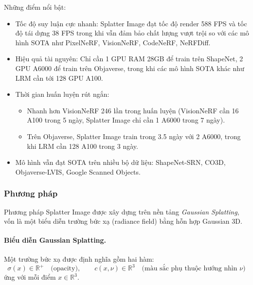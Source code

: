             Những điểm nổi bật:
            \begin{itemize}
            	\item Tốc độ suy luận cực nhanh: Splatter Image đạt tốc độ render 588 FPS và tốc độ tái dựng 38 FPS trong khi vẫn đảm bảo chất lượng vượt trội so với các mô hình SOTA như PixelNeRF, VisionNeRF, CodeNeRF, NeRFDiff.
            	\item Hiệu quả tài nguyên: Chỉ cần 1 GPU RAM 28GB để train trên ShapeNet, 2 GPU A6000 để train trên Objaverse, trong khi các mô hình SOTA khác như LRM cần tới 128 GPU A100.
            	\item Thời gian huấn luyện rút ngắn: 
            		\begin{itemize}
            			\item Nhanh hơn VisionNeRF 246 lần trong huấn luyện (VisionNeRF cần 16 A100 trong 5 ngày, Splatter Image chỉ cần 1 A6000 trong 7 ngày).
            			\item Trên Objaverse, Splatter Image train trong 3.5 ngày với 2 A6000, trong khi LRM cần 128 A100 trong 3 ngày.
            		\end{itemize}
            	\item Mô hình vẫn đạt SOTA trên nhiều bộ dữ liệu: ShapeNet-SRN, CO3D, Objaverse-LVIS, Google Scanned Objects.
            \end{itemize}
            
            \subsubsection{Phương pháp}

                Phương pháp Splatter Image được xây dựng trên nền tảng \textit{Gaussian Splatting}, vốn là một biểu diễn trường bức xạ (radiance field) bằng hỗn hợp Gaussian 3D.  
                
                \paragraph{Biểu diễn Gaussian Splatting.}  
                Một trường bức xạ được định nghĩa gồm hai hàm:
                \[
                \sigma(x) \in \mathbb{R}^+ \quad \text{(opacity)}, \qquad c(x,\nu) \in \mathbb{R}^3 \quad \text{(màu sắc phụ thuộc hướng nhìn $\nu$)} 
                \]
                ứng với mỗi điểm $x \in \mathbb{R}^3$.  
                
